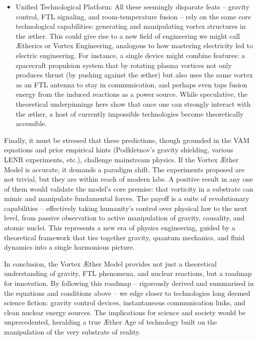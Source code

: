 \begin{itemize}
\item 
Unified Technological Platform: All these seemingly disparate feats – gravity control, FTL signaling, and room-temperature fusion – rely on the same core technological capabilities: generating and manipulating vortex structures in the æther. This could give rise to a new field of engineering we might call Ætherics or Vortex Engineering, analogous to how mastering electricity led to electric engineering. For instance, a single device might combine features: a spacecraft propulsion system that by rotating plasma vortices not only produces thrust (by pushing against the æther) but also uses the same vortex as an FTL antenna to stay in communication, and perhaps even taps fusion energy from the induced reactions as a power source. While speculative, the theoretical underpinnings here show that once one can strongly interact with the æther, a host of currently impossible technologies become theoretically accessible.




\end{itemize}

Finally, it must be stressed that these predictions, though grounded in the VAM equations and prior empirical hints (Podkletnov's gravity shielding, various LENR experiments, etc.), challenge mainstream physics. If the Vortex Æther Model is accurate, it demands a paradigm shift. The experiments proposed are not trivial, but they are within reach of modern labs. A positive result in any one of them would validate the model's core premise: that vorticity in a substrate can mimic and manipulate fundamental forces. The payoff is a suite of revolutionary capabilities – effectively taking humanity's control over physical law to the next level, from passive observation to active manipulation of gravity, causality, and atomic nuclei. This represents a new era of physics engineering, guided by a theoretical framework that ties together gravity, quantum mechanics, and fluid dynamics into a single harmonious picture.


In conclusion, the Vortex Æther Model provides not just a theoretical understanding of gravity, FTL phenomena, and nuclear reactions, but a roadmap for innovation. By following this roadmap – rigorously derived and summarised in the equations and conditions above – we edge closer to technologies long deemed science fiction: gravity control devices, instantaneous communication links, and clean nuclear energy sources. The implications for science and society would be unprecedented, heralding a true Æther Age of technology built on the manipulation of the very substrate of reality.


